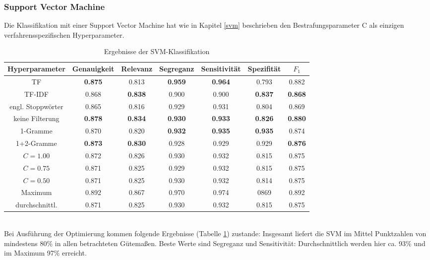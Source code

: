 \subsubsection{Support Vector Machine}
Die Klassifikation mit einer Support Vector Machine hat wie in Kapitel \ref{svm} beschrieben den Bestrafungsparameter C als einzigen verfahrensspezifischen Hyperparameter.
\begin{table}[htb]
	\begin{center}
		\begin{tabular}{|c|c|c|c|c|c|c|}
			\hline 
			Hyperparameter & Genauigkeit & Relevanz & Segreganz & Sensitivität & Spezifität & $F_1$ \\ \hline \hline
			TF         & \textbf{0.875} & 0.813 & \textbf{0.959} & \textbf{0.964} & 0.793 & 0.882 \\ \hline
			TF-IDF     & 0.868 & \textbf{0.838} & 0.900 & 0.900 & \textbf{0.837} & \textbf{0.868} \\ \hline \hline
			engl. Stoppwörter  & 0.865 & 0.816 & 0.929 & 0.931 & 0.804 & 0.869 \\ \hline
			keine Filterung    & \textbf{0.878} & \textbf{0.834} & \textbf{0.930} & \textbf{0.933} & \textbf{0.826} & \textbf{0.880} \\ \hline \hline
			1-Gramme   & 0.870 & 0.820 & \textbf{0.932} & \textbf{0.935} & \textbf{0.935} & 0.874 \\ \hline
			1+2-Gramme  & \textbf{0.873} & \textbf{0.830} & 0.928 & 0.929 & 0.929 & \textbf{0.876} \\ \hline \hline
			$C=1.00$ & 0.872 & 0.826 & 0.930 & 0.932 & 0.815 & 0.875 \\ \hline 
			$C=0.75$ & 0.871 & 0.825 & 0.929 & 0.932 & 0.815 & 0.875 \\ \hline 
			$C=0.50$ & 0.871 & 0.825 & 0.930 & 0.932 & 0.814 & 0.875 \\ \hline
			\hline
			Maximum        & 0.892 & 0.867 & 0.970 & 0.974 & 0869 & 0.892 \\ \hline
			durchschnittl. & 0.871 & 0.825 & 0.930 & 0.932 & 0.815 & 0.875 \\ \hline
		\end{tabular}
		\caption{Ergebnisse der SVM-Klassifikation}\label{results-svm}
	\end{center}
\end{table}\\
Bei Ausführung der Optimierung kommen folgende Ergebnisse (Tabelle \ref{results-svm}) zustande:
Insgesamt liefert die SVM im Mittel Punktzahlen von mindestens 80\% in allen betrachteten Gütemaßen. Beste Werte sind Segreganz und Sensitivität: Durchschnittlich werden hier ca. 93\% und im Maximum 97\% erreicht.\\
